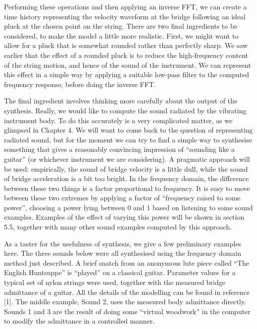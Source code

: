   Performing these operations and then applying an inverse FFT, we can create a 
  time history representing the velocity waveform at the bridge following an 
  ideal pluck at the chosen point on the string. There are two final 
  ingredients to be considered, to make the model a little more realistic. 
  First, we might want to allow for a pluck that is somewhat rounded rather 
  than perfectly sharp. We saw earlier that the effect of a rounded pluck is to 
  reduce the high-frequency content of the string motion, and hence of the 
  sound of the instrument. We can represent this effect in a simple way by 
  applying a suitable low-pass filter to the computed frequency response, 
  before doing the inverse FFT. 

  The final ingredient involves thinking more carefully about the output of the 
  synthesis. Really, we would like to compute the sound radiated by the 
  vibrating instrument body. To do this accurately is a very complicated 
  matter, as we glimpsed in Chapter 4. We will want to come back to the 
  question of representing radiated sound, but for the moment we can try to 
  find a simple way to synthesise something that gives a reasonably convincing 
  impression of ``sounding like a guitar'' (or whichever instrument we are 
  considering). A pragmatic approach will be used: empirically, the sound of 
  bridge velocity is a little dull, while the sound of bridge acceleration is a 
  bit too bright. In the frequency domain, the difference between these two 
  things is a factor proportional to frequency. It is easy to move between 
  these two extremes by applying a factor of ``frequency raised to some 
  power'', choosing a power lying between 0 and 1 based on listening to some 
  sound examples. Examples of the effect of varying this power will be shown in 
  section 5.5, together with many other sound examples computed by this 
  approach. 

  As a taster for the usefulness of synthesis, we give a few preliminary 
  examples here. The three sounds below were all synthesised using the 
  frequency domain method just described. A brief snatch from an anonymous lute 
  piece called ``The English Huntsuppe'' is ``played'' on a classical guitar. 
  Parameter values for a typical set of nylon strings were used, together with 
  the measured bridge admittance of a guitar. All the details of the modelling 
  can be found in reference [1]. The middle example, Sound 2, uses the measured 
  body admittance directly. Sounds 1 and 3 are the result of doing some 
  ``virtual woodwork'' in the computer to modify the admittance in a controlled 
  manner. 

